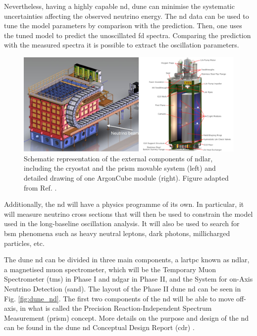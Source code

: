 Nevertheless, having a highly capable \gls{nd}, \gls{dune} can minimise the systematic uncertainties affecting the observed neutrino energy. The \gls{nd} data can be used to tune the model parameters by comparison with the prediction. Then, one uses the tuned model to predict the unoscillated \gls{fd} spectra. Comparing the prediction with the measured spectra it is possible to extract the oscillation parameters.

\begin{figure}[t]
	\centering
	\includegraphics[width=0.99\linewidth]{Images/DUNE/ND/nd_lar_mod}
	\caption[Schematic representation of the external components of \gls{ndlar}, including the cryostat and the \gls{prism} movable system.]{Schematic representation of the external components of \gls{ndlar}, including the cryostat and the \gls{prism} movable system (left) and detailed drawing of one ArgonCube module (right). Figure adapted from Ref. \cite{DUNE2020TDR1}.}
	\label{fig:dune_nd_lar}
\end{figure}

Additionally, the \gls{nd} will have a physics programme of its own. In particular, it will measure neutrino cross sections that will then be used to constrain the model used in the long-baseline oscillation analysis. It will also be used to search for \gls{bsm} phenomena such as heavy neutral leptons, dark photons, millicharged particles, etc.

The \gls{dune} \gls{nd} can be divided in three main components, a \gls{lartpc} known as \gls{ndlar}, a magnetised muon spectrometer, which will be the Temporary Muon Spectrometer (\gls{tms}) in Phase I and \gls{ndgar} in Phase II, and the System for on-Axis Neutrino Detection (\gls{sand}). The layout of the Phase II \gls{dune} \gls{nd} can be seen in Fig. \ref{fig:dune_nd}. The first two components of the \gls{nd} will be able to move off-axis, in what is called the Precision Reaction-Independent Spectrum Measurement (\gls{prism}) concept. More details on the purpose and design of the \gls{nd} can be found in the \gls{dune} \gls{nd} Conceptual Design Report (\gls{cdr}) \cite{DUNE2021NDCDR}.

